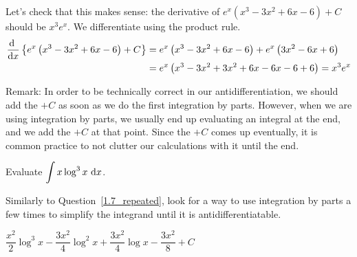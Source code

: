 \begin{solution}
Let's check that this makes sense: the derivative of $e^x\left(x^3-3x^2+6x - 6\right)+C$ should be $x^3e^x$. We differentiate using the product rule.
\begin{align*}
\diff{}{x}\left\{e^x\left(x^3-3x^2+6x - 6\right)+C\right\}
&=e^x\left(x^3-3x^2+6x - 6\right)+e^x\left(3x^2-6x+6\right)\\
&=e^x\left(x^3-3x^2+3x^2+6x-6x-6+6\right)=x^3e^x
\end{align*}

Remark: In order to be technically correct in our antidifferentiation, we should add the $+C$ as soon as we do the first integration by parts. However, when we are using integration by parts, we usually end up evaluating an integral at the end, and we add the $+C$ at that point. Since the $+C$ comes up eventually, it is common practice to not clutter our calculations with it until the end.
\end{solution}
\begin{question}
Evaluate $\displaystyle\int x \log^3 x~ \mathrm{d}x$.
\end{question}
\begin{hint}
Similarly to Question~\ref{1.7_repeated}, look for a way to use integration by parts a few times to simplify the integrand until it is antidifferentiatable.
\end{hint}
\begin{answer}
$\dfrac{x^2}{2}\log^3x -
\dfrac{3x^2}{4}\log^2 x + \dfrac{3x^2}{4}\log x
 - \dfrac{3x^2}{8}+C$
\end{answer}
